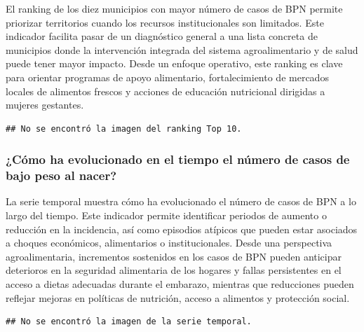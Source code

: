 \documentclass[
]{article}
\begin{document}
El ranking de los diez municipios con mayor número de casos de BPN
permite priorizar territorios cuando los recursos institucionales son
limitados. Este indicador facilita pasar de un diagnóstico general a una
lista concreta de municipios donde la intervención integrada del sistema
agroalimentario y de salud puede tener mayor impacto. Desde un enfoque
operativo, este ranking es clave para orientar programas de apoyo
alimentario, fortalecimiento de mercados locales de alimentos frescos y
acciones de educación nutricional dirigidas a mujeres gestantes.

\begin{verbatim}
## No se encontró la imagen del ranking Top 10.
\end{verbatim}

\subsubsection{¿Cómo ha evolucionado en el tiempo el número de casos de
bajo peso al
nacer?}\label{cuxf3mo-ha-evolucionado-en-el-tiempo-el-nuxfamero-de-casos-de-bajo-peso-al-nacer}

La serie temporal muestra cómo ha evolucionado el número de casos de BPN
a lo largo del tiempo. Este indicador permite identificar periodos de
aumento o reducción en la incidencia, así como episodios atípicos que
pueden estar asociados a choques económicos, alimentarios o
institucionales. Desde una perspectiva agroalimentaria, incrementos
sostenidos en los casos de BPN pueden anticipar deterioros en la
seguridad alimentaria de los hogares y fallas persistentes en el acceso
a dietas adecuadas durante el embarazo, mientras que reducciones pueden
reflejar mejoras en políticas de nutrición, acceso a alimentos y
protección social.

\begin{verbatim}
## No se encontró la imagen de la serie temporal.
\end{verbatim}
\end{document}
